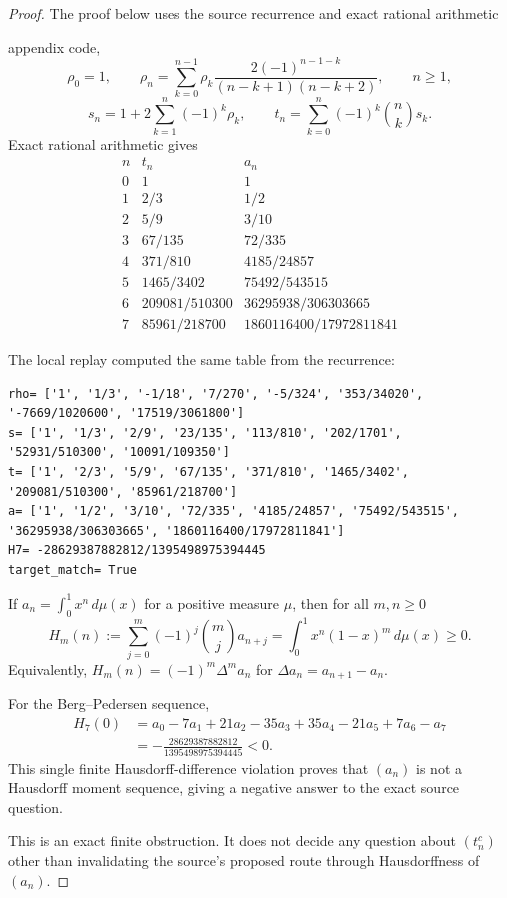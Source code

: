 \documentclass[11pt]{article}
\numberwithin{equation}{section}
\theoremstyle{definition}
\theoremstyle{remark}
\newcommand{\1}{\mathbf 1}
\begin{document}
\begin{proof}
The proof below uses the source recurrence and exact rational arithmetic

appendix code,
\[
\rho_0=1,\qquad
\rho_n=\sum_{k=0}^{n-1}\rho_k
\frac{2(-1)^{n-1-k}}{(n-k+1)(n-k+2)},\qquad n\ge1,
\]
\[
s_n=1+2\sum_{k=1}^n(-1)^k\rho_k,\qquad
t_n=\sum_{k=0}^n(-1)^k\binom nk s_k.
\]
Exact rational arithmetic gives
\[
\begin{array}{c|c|c}
n&t_n&a_n\\
\hline
0&1&1\\
1&2/3&1/2\\
2&5/9&3/10\\
3&67/135&72/335\\
4&371/810&4185/24857\\
5&1465/3402&75492/543515\\
6&209081/510300&36295938/306303665\\
7&85961/218700&1860116400/17972811841
\end{array}
\]

The local replay computed the same table from the recurrence:

\begin{verbatim}
rho= ['1', '1/3', '-1/18', '7/270', '-5/324', '353/34020', '-7669/1020600', '17519/3061800']
s= ['1', '1/3', '2/9', '23/135', '113/810', '202/1701', '52931/510300', '10091/109350']
t= ['1', '2/3', '5/9', '67/135', '371/810', '1465/3402', '209081/510300', '85961/218700']
a= ['1', '1/2', '3/10', '72/335', '4185/24857', '75492/543515', '36295938/306303665', '1860116400/17972811841']
H7= -28629387882812/1395498975394445
target_match= True
\end{verbatim}

If \(a_n=\int_0^1 x^n\,d\mu(x)\) for a positive measure \(\mu\), then for
all \(m,n\ge0\)
\[
H_m(n):=\sum_{j=0}^m(-1)^j\binom mj a_{n+j}
=\int_0^1 x^n(1-x)^m\,d\mu(x)\ge0.
\]
Equivalently, \(H_m(n)=(-1)^m\Delta^m a_n\) for
\(\Delta a_n=a_{n+1}-a_n\).

For the Berg--Pedersen sequence,
\[
\begin{aligned}
H_7(0)
&=a_0-7a_1+21a_2-35a_3+35a_4-21a_5+7a_6-a_7\\
&=-\frac{28629387882812}{1395498975394445}<0.
\end{aligned}
\]
This single finite Hausdorff-difference violation proves that \((a_n)\) is
not a Hausdorff moment sequence, giving a negative answer to the exact source
question.

This is an exact finite obstruction. It does not decide any question about
\((t_n^c)\) other than invalidating the source's proposed route through
Hausdorffness of \((a_n)\).
\end{proof}
\end{document}
